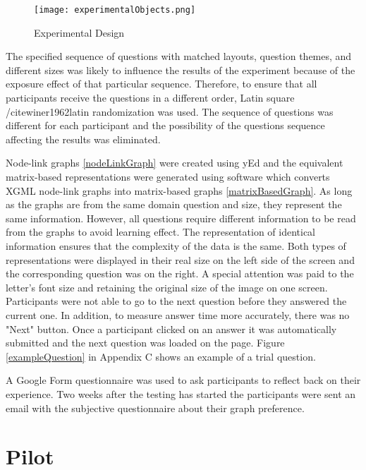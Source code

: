 \documentclass{l4proj}
\begin{document}
\begin{figure}[H]
\centering
\texttt{[image: experimentalObjects.png]}
\caption{Experimental Design}
\label{experimentalDesign}
\end{figure}


The specified sequence of questions with matched layouts, question themes, and different sizes was likely to influence the results of the experiment because of the exposure effect of that particular sequence. Therefore, to ensure that all participants receive the questions in a different order, Latin square /cite{winer1962latin} randomization was used. The sequence of questions was different for each participant and the possibility of the questions sequence affecting the results was eliminated.
  
Node-link graphs \ref{nodeLinkGraph} were created using yEd and the equivalent matrix-based representations were generated using software which converts XGML node-link graphs into matrix-based graphs \ref{matrixBasedGraph}. As long as the graphs are from the same domain question and size, they represent the same information. However, all questions require different information to be read from the graphs to avoid learning effect. The representation of identical information ensures that the complexity of the data is the same. Both types of representations were displayed in their real size on the left side of the screen and the corresponding question was on the right. A special attention was paid to the letter's font size and retaining the original size of the image on one screen. Participants were not able to go to the next question before they answered the current one. In addition, to measure answer time more accurately, there was no "Next" button. Once a participant clicked on an answer it was automatically submitted and the next question was loaded on the page. Figure \ref{exampleQuestion} in Appendix C shows an example of a trial question.

A Google Form questionnaire was used to ask participants to reflect back on their experience. Two weeks after the testing has started the participants were sent an email with the subjective questionnaire about their graph preference. 

\section{Pilot}
\end{document}

